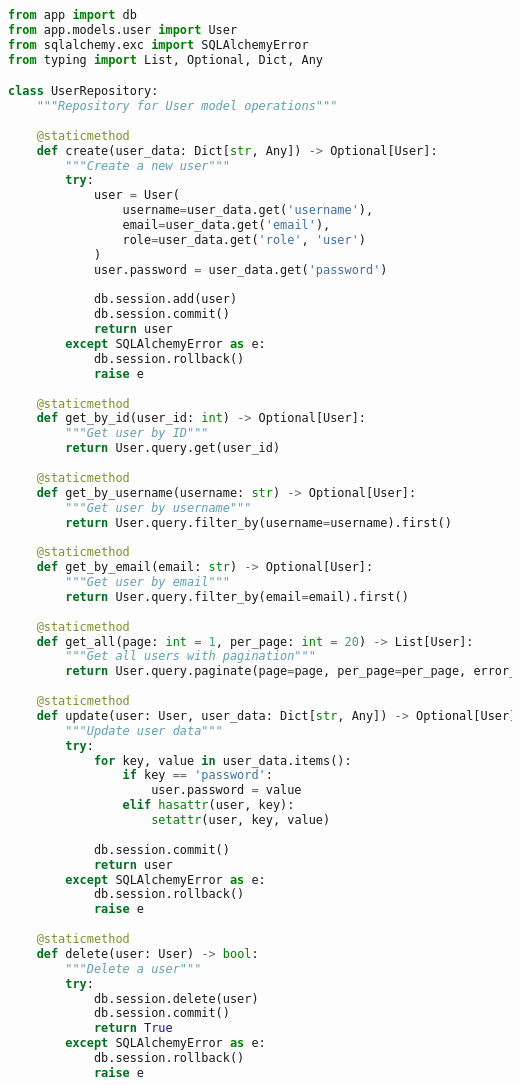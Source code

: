 \documentclass{article}
\begin{document}
\begin{lstlisting}[language=python, caption=User Repository in app/repositories/user\_repository.py]
from app import db
from app.models.user import User
from sqlalchemy.exc import SQLAlchemyError
from typing import List, Optional, Dict, Any

class UserRepository:
    """Repository for User model operations"""
    
    @staticmethod
    def create(user_data: Dict[str, Any]) -> Optional[User]:
        """Create a new user"""
        try:
            user = User(
                username=user_data.get('username'),
                email=user_data.get('email'),
                role=user_data.get('role', 'user')
            )
            user.password = user_data.get('password')
            
            db.session.add(user)
            db.session.commit()
            return user
        except SQLAlchemyError as e:
            db.session.rollback()
            raise e
    
    @staticmethod
    def get_by_id(user_id: int) -> Optional[User]:
        """Get user by ID"""
        return User.query.get(user_id)
    
    @staticmethod
    def get_by_username(username: str) -> Optional[User]:
        """Get user by username"""
        return User.query.filter_by(username=username).first()
    
    @staticmethod
    def get_by_email(email: str) -> Optional[User]:
        """Get user by email"""
        return User.query.filter_by(email=email).first()
    
    @staticmethod
    def get_all(page: int = 1, per_page: int = 20) -> List[User]:
        """Get all users with pagination"""
        return User.query.paginate(page=page, per_page=per_page, error_out=False).items
    
    @staticmethod
    def update(user: User, user_data: Dict[str, Any]) -> Optional[User]:
        """Update user data"""
        try:
            for key, value in user_data.items():
                if key == 'password':
                    user.password = value
                elif hasattr(user, key):
                    setattr(user, key, value)
            
            db.session.commit()
            return user
        except SQLAlchemyError as e:
            db.session.rollback()
            raise e
    
    @staticmethod
    def delete(user: User) -> bool:
        """Delete a user"""
        try:
            db.session.delete(user)
            db.session.commit()
            return True
        except SQLAlchemyError as e:
            db.session.rollback()
            raise e
\end{lstlisting}
\end{document}
